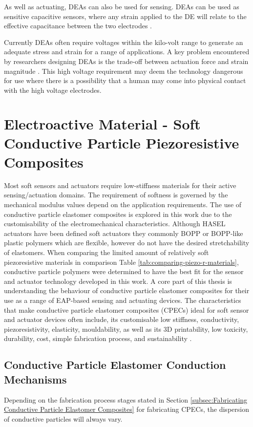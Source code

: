 As well as actuating, DEAs can also be used for sensing. DEAs can be used as sensitive capacitive sensors, where any strain applied to the DE will relate to the effective capacitance between the two electrodes \citep{Jung2008,Goulbourne2007,Gisby2013}. 

Currently DEAs often require voltages within the kilo-volt range to generate an adequate stress and strain for a range of applications. A key problem encountered by researchers designing DEAs is the trade-off between actuation force and strain magnitude \citep{Hau2018}. This high voltage requirement may deem the technology dangerous for use where there is a possibility that a human may come into physical contact with the high voltage electrodes.


\section{Electroactive Material - Soft Conductive Particle Piezoresistive Composites}
\label{sec:Soft Piezoresistive Composites}
Most soft sensors and actuators require low-stiffness materials for their active sensing/actuation domains. The requirement of softness is governed by the mechanical modulus values depend on the application requirements. The use of conductive particle elastomer composites is explored in this work due to the customisability of the electromechanical characteristics. Although HASEL actuators have been defined soft actuators they commonly BOPP or BOPP-like plastic polymers which are flexible, however do not have the desired stretchability of elastomers. When comparing the limited amount of relatively soft piezoresistive materials in comparison Table \ref{tab:comparing-piezo-r-materials}, conductive particle polymers were determined to have the best fit for the sensor and actuator technology developed in this work.
A core part of this thesis is understanding the behaviour of conductive particle elastomer composites for their use as a range of EAP-based sensing and actuating devices. The characteristics that make conductive particle elastomer composites (CPECs) ideal for soft sensor and actuator devices often include, its customisable low stiffness, conductivity, piezoresistivity, elasticity, mouldability,  as well as its 3D printability, low toxicity, durability, cost, simple fabrication process, and sustainability \cite{Chung2020,Ge2020,HindermannBischoff2001,Kim2012}.


\subsection{Conductive Particle Elastomer Conduction Mechanisms}
Depending on the fabrication process stages stated in Section \ref{subsec:Fabricating Conductive Particle Elastomer Composites} for fabricating CPECs, the dispersion of conductive particles will always vary. 

